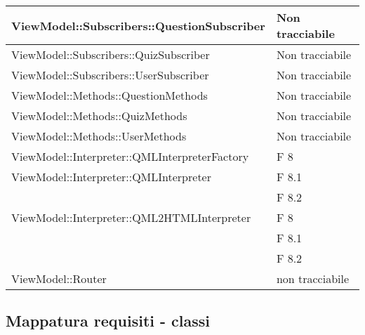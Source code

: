 \begin{longtable}{p{}p{}}

\midrule
ViewModel::Subscribers::QuestionSubscriber	& Non tracciabile\\
\midrule
ViewModel::Subscribers::QuizSubscriber	& Non tracciabile\\
\midrule
ViewModel::Subscribers::UserSubscriber	& Non tracciabile\\


\midrule
ViewModel::Methods::QuestionMethods	& Non tracciabile\\
\midrule
ViewModel::Methods::QuizMethods	& Non tracciabile\\
\midrule
ViewModel::Methods::UserMethods	& Non tracciabile\\


\midrule
ViewModel::Interpreter::QMLInterpreterFactory	& F 8\\
												
\midrule
ViewModel::Interpreter::QMLInterpreter	& F 8.1\\
										& F 8.2\\
\midrule
ViewModel::Interpreter::QML2HTMLInterpreter	& F 8\\
											& F 8.1\\
											& F 8.2\\
\midrule
ViewModel::Router							& non tracciabile\\
\midrule
							
\end{longtable}
\newpage

\subsection{Mappatura requisiti - classi}

